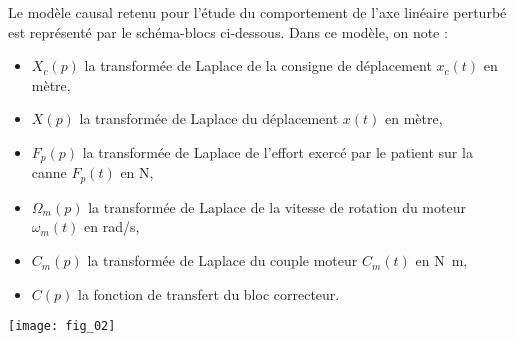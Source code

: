 \begin{multicols}{2}
Le modèle causal retenu pour l'étude du comportement de l'axe linéaire perturbé est représenté par le schéma-blocs ci-dessous. Dans ce modèle, on note :
\begin{itemize}
\item $X_c(p)$ la transformée de Laplace de la consigne de déplacement  $x_c(t)$ en mètre,
\item $X(p)$ la transformée de Laplace du déplacement $x(t)$ en mètre,
\item $F_p(p)$ la transformée de Laplace de   l'effort exercé par le patient sur la canne $F_p(t)$ en N,
\item $\Omega_m(p)$ la transformée de Laplace de la vitesse de rotation du moteur $\omega_m(t)$ en rad/s,
\item $C_m(p)$ la transformée de Laplace du couple moteur $C_m(t)$ en \si{N.m},
\item $C(p)$ la fonction de transfert du bloc correcteur.
\end{itemize}
\begin{center}
\texttt{[image: fig\_02]}
\end{center}
\fi
%

\end{multicols}
